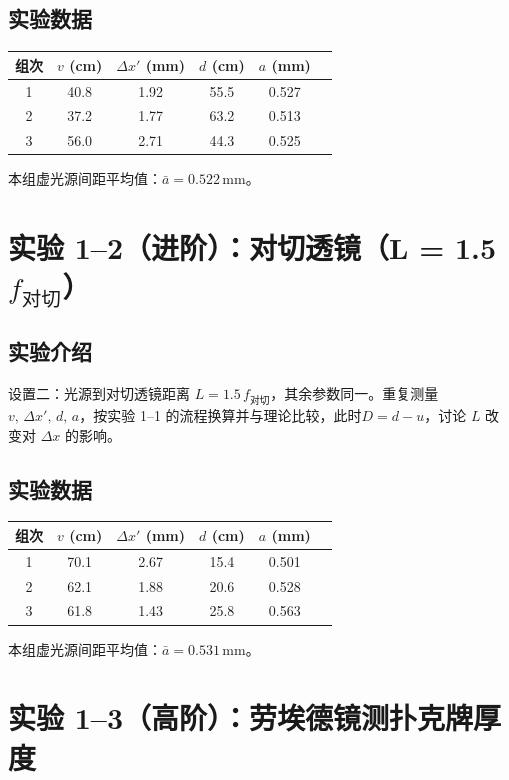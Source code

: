 \documentclass[12pt,a4paper]{article}
\begin{document}
\subsection*{实验数据}
\begin{center}
\begin{tabular}{cccccc}
\toprule
组次 & $v$ (cm) & $\Delta x'$ (mm) & $d$ (cm) & $a$ (mm) \\
\midrule
1 & 40.8 & 1.92 & 55.5 & 0.527 \\
2 & 37.2 & 1.77 & 63.2 & 0.513 \\
3 & 56.0 & 2.71 & 44.3 & 0.525 \\
\bottomrule
\end{tabular}
\end{center}

\noindent 本组虚光源间距平均值：$\bar a = 0.522\,\mathrm{mm}$。


\section{实验 1--2（进阶）：对切透镜（L = 1.5\,$f_{\text{对切}}$）}
\subsection*{实验介绍}
设置二：光源到对切透镜距离 $L=1.5\,f_{\text{对切}}$，其余参数同一。重复测量 $v,\,\Delta x',\,d,\,a$，按实验 1--1 的流程换算并与理论比较，此时$D = d - u$，讨论 $L$ 改变对 $\Delta x$ 的影响。

\subsection*{实验数据}
\begin{center}
\begin{tabular}{cccccc}
\toprule
组次 & $v$ (cm) & $\Delta x'$ (mm) & $d$ (cm) & $a$ (mm)  \\
\midrule
1 & 70.1 & 2.67 & 15.4 & 0.501 \\
2 & 62.1 & 1.88 & 20.6 & 0.528  \\
3 & 61.8 & 1.43 & 25.8 & 0.563  \\
\bottomrule
\end{tabular}
\end{center}

\noindent 本组虚光源间距平均值：$\bar a = 0.531\,\mathrm{mm}$。


\section{实验 1--3（高阶）：劳埃德镜测扑克牌厚度}
\end{document}
